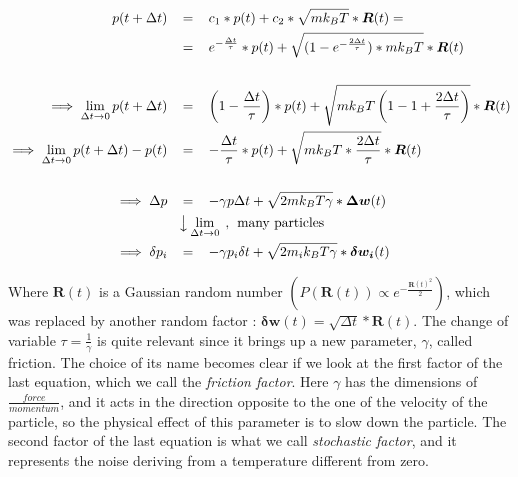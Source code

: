 \begin{align*}
p(t+\Delta t) \hspace{0.3cm}&=\hspace{0.3cm} c_1*p(t) + c_2*\sqrt{mk_BT}*\boldsymbol{R}(t) =\\
&=\hspace{0.3cm} e^{-\frac{\Delta t}{\tau}}*p(t) + \sqrt{(1- e^{-\frac{2\Delta t}{\tau}})*mk_BT}*\boldsymbol{R}(t) \\ \\
\implies \lim_{\Delta t\to 0} p(t+\Delta t) \hspace{0.3cm} &=\hspace{0.3cm} \left(1-\frac{\Delta t}{\tau}\right)*p(t) +\sqrt{mk_BT\left(1-1+\frac{2\Delta t}{\tau}\right)}*\boldsymbol{R}(t) \\
\implies \lim_{\Delta t\to 0} p(t+\Delta t)-p(t) \hspace{0.3cm}&= \hspace{0.3cm} -\frac{\Delta t}{\tau}*p(t) +\sqrt{mk_BT*\frac{2\Delta t}{\tau}}*\boldsymbol{R}(t) \\ \\
\implies \Delta p \hspace{0.3cm}&=\hspace{0.3cm} -\gamma p \Delta t +\sqrt{2mk_BT\gamma}*\boldsymbol{\Delta w}(t)\\
&\big\downarrow \lim_{\Delta t\to 0} \hspace{0.15cm},\hspace{0.15cm} \textrm{many particles}\\
\implies \delta p_i \hspace{0.3cm}&=\hspace{0.3cm} -\gamma p_i \delta t +\sqrt{2m_ik_BT\gamma}*\boldsymbol{\delta w_i}(t)\\
\end{align*}

Where $\boldsymbol{R}(t)$ is a Gaussian random number $\left(P(\boldsymbol{R}(t)) \propto e^{-\frac{\boldsymbol{R}(t)^2}{2}}\right)$, which was replaced by another random factor : $\boldsymbol{\delta w}(t) = \sqrt{\Delta t}*\boldsymbol{R}(t)$. The change of variable $\tau = \frac{1}{\gamma}$ is quite relevant since it brings up a new parameter, $\gamma$, called friction. The choice of its name becomes clear if we look at the first factor of the last equation, which we call the \textit{friction factor}. Here $\gamma$ has the dimensions of $\frac{force}{momentum}$, and it acts in the direction opposite to the one of the velocity of the particle, so the physical effect of this parameter is to slow down the particle.
The second factor of the last equation is what we call \textit{stochastic factor}, and it represents the noise deriving from a temperature different from zero.

